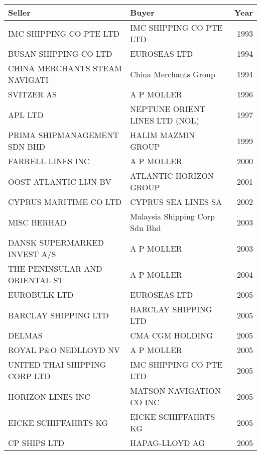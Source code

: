 
\begin{tabular}[t]{llr}
\toprule
Seller & Buyer & Year\\
\midrule
IMC SHIPPING CO PTE LTD & IMC SHIPPING CO PTE LTD & 1993\\
BUSAN SHIPPING CO LTD & EUROSEAS LTD & 1994\\
CHINA MERCHANTS STEAM NAVIGATI & China Merchants Group & 1994\\
SVITZER AS & A P MOLLER & 1996\\
APL LTD & NEPTUNE ORIENT LINES LTD (NOL) & 1997\\
PRIMA SHIPMANAGEMENT SDN BHD & HALIM MAZMIN GROUP & 1999\\
FARRELL LINES INC & A P MOLLER & 2000\\
OOST ATLANTIC LIJN BV & ATLANTIC HORIZON GROUP & 2001\\
CYPRUS MARITIME CO LTD & CYPRUS SEA LINES SA & 2002\\
MISC BERHAD & Malaysia Shipping Corp Sdn Bhd & 2003\\
DANSK SUPERMARKED INVEST A/S & A P MOLLER & 2003\\
THE PENINSULAR AND ORIENTAL ST & A P MOLLER & 2004\\
EUROBULK LTD & EUROSEAS LTD & 2005\\
BARCLAY SHIPPING LTD & BARCLAY SHIPPING LTD & 2005\\
DELMAS & CMA CGM HOLDING & 2005\\
ROYAL P\&O NEDLLOYD NV & A P MOLLER & 2005\\
UNITED THAI SHIPPING CORP LTD & IMC SHIPPING CO PTE LTD & 2005\\
HORIZON LINES INC & MATSON NAVIGATION CO INC & 2005\\
EICKE SCHIFFAHRTS KG & EICKE SCHIFFAHRTS KG & 2005\\
CP SHIPS LTD & HAPAG-LLOYD AG & 2005\\
\bottomrule
\end{tabular}
